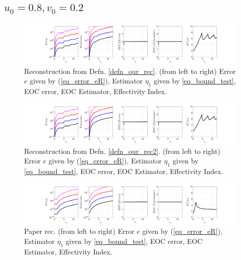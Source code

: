 \documentclass[12pt,a4paper]{article}
\numberwithin{equation}{section}
\theoremstyle{definition}
\begin{document}
\subsection*{$u_0=0.8, v_0= 0.2$}
\begin{figure}[H]
	\hspace{-3cm}
	\includegraphics[scale=0.55]{fig_LeapFrogplots_1x5_sin_IC_harmonic_order_2_u8_v2_rec_george}	
	\caption{Reconstruction from Defn. \ref{defn_our_rec}. (from left to right) Error $e$ given by (\ref{eq_error_eR}), Estimator $\eta_1$ given by \ref{eq_bound_test},   EOC error, EOC Estimator, Effectivity Index.}
	\label{fig_all_in_one_our_rec_george_u8_v2}
\end{figure}
\begin{figure}[H]
	\hspace{-3cm}
	\includegraphics[scale=0.55]{fig_LeapFrogplots_1x5_sin_IC_harmonic_order_2_u8_v2_rec2}	
	\caption{Reconstruction from Defn. \ref{defn_our_rec2}. (from left to right) Error $e$ given by (\ref{eq_error_eR}), Estimator $\eta_1$ given by \ref{eq_bound_test},   EOC error, EOC Estimator, Effectivity Index.}
	\label{fig_all_in_one_our_rec_2_u8_v2}
\end{figure}
\begin{figure}[H]
	\hspace{-3cm}
	\includegraphics[scale=0.55]{fig_LeapFrogplots_1x5_sin_IC_harmonic_u8_v2_paperrec}	
	\caption{Paper rec. (from left to right) Error $e$ given by (\ref{eq_error_eR}), Estimator $\eta_1$ given by \ref{eq_bound_test},   EOC error, EOC Estimator, Effectivity Index.}
	\label{fig_all_in_one_paperrec_u08_v02}
\end{figure}
\end{document}
